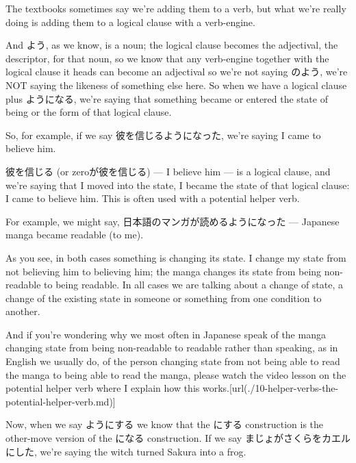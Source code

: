 The textbooks sometimes say we're adding them to a verb, but what we're really doing is adding them to a logical clause with a verb-engine.

{}

And よう, as we know, is a noun; the logical clause becomes the adjectival, the descriptor, for that noun, so we know that any verb-engine together with the logical clause it heads can become an adjectival so we're not saying のよう, we're NOT saying the likeness of something else here. So when we have a logical clause plus ようになる, we're saying that something became or entered the state of being or the form of that logical clause.

So, for example, if we say 彼を信じるようになった, we're saying I came to believe him.

{}

彼を信じる (or zeroが彼を信じる) --- I believe him --- is a logical clause, and we're saying that I moved into the state, I became the state of that logical clause: I came to believe him. This is often used with a potential helper verb.

For example, we might say, 日本語のマンガが読めるようになった --- Japanese manga became readable (to me).

{}

As you see, in both cases something is changing its state. I change my state from not believing him to believing him; the manga changes its state from being non-readable to being readable. In all cases we are talking about a change of state, a change of the existing state in someone or something from one condition to another.

And if you're wondering why we most often in Japanese speak of the manga changing state from being non-readable to readable rather than speaking, as in English we usually do, of the person changing state from not being able to read the manga to being able to read the manga, please watch the video lesson on the potential helper verb where I explain how this works.\goto{{[}10{]}}[url(./10-helper-verbs-the-potential-helper-verb.md)]

\stopsectionlevel

\startsectionlevel[title={ようにする},reference={ようにする}]

Now, when we say ようにする we know that the にする construction is the other-move version of the になる construction. If we say まじょがさくらをカエルにした, we're saying the witch turned Sakura into a frog.


